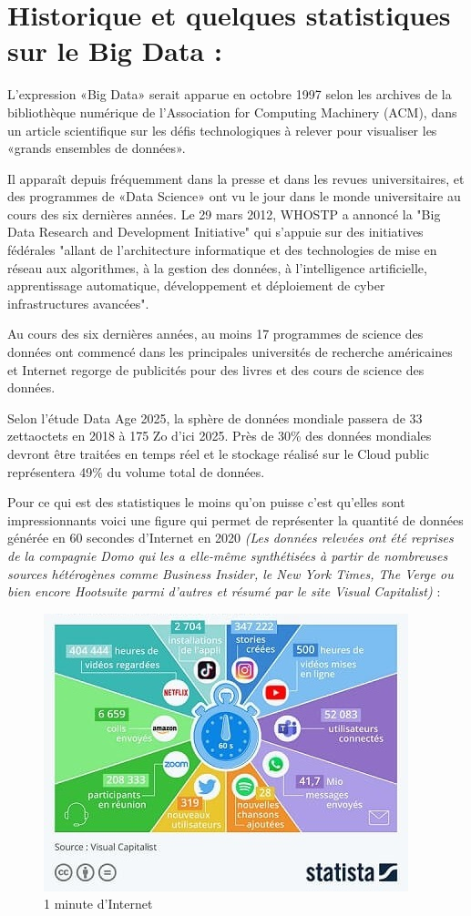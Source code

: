 \section{Historique et quelques statistiques sur le Big Data : }
L'expression «Big Data» serait apparue en octobre 1997 selon les archives de la bibliothèque numérique de l'Association for Computing Machinery (ACM), dans un article scientifique sur les défis technologiques à relever pour visualiser les «grands ensembles de données».

Il apparaît depuis fréquemment dans la presse et dans les revues universitaires, et des programmes de «Data Science» ont vu le jour dans le monde universitaire au cours des six dernières années. Le 29 mars 2012, WHOSTP a annoncé la "Big Data Research and Development Initiative" qui s'appuie sur des initiatives fédérales "allant de l'architecture informatique et des technologies de mise en réseau aux algorithmes, à la gestion des données, à l'intelligence artificielle, apprentissage automatique, développement et déploiement de cyber infrastructures avancées".

Au cours des six dernières années, au moins 17 programmes de science des données ont commencé dans les principales universités de recherche américaines et Internet regorge de publicités pour des livres et des cours de science des données. 

Selon l'étude Data Age 2025, la sphère de données mondiale passera de 33 zettaoctets en 2018 à 175 Zo d'ici 2025. Près de 30\% des données mondiales devront être traitées en temps réel et le stockage réalisé sur le Cloud public représentera 49\% du volume total de données.

Pour ce qui est des statistiques le moins qu'on puisse c'est qu'elles sont impressionnants voici une figure qui permet de représenter la quantité de données générée en 60 secondes d'Internet en 2020 
\textit{(Les données relevées ont été reprises de la compagnie Domo qui les a elle-même synthétisées à partir de nombreuses sources hétérogènes comme Business Insider, le New York Times, The Verge ou bien encore Hootsuite parmi d'autres et résumé par le site Visual Capitalist)} :

\begin{figure}[h]
	\centering
    \includegraphics[scale=0.8]{img/1.1}
    \caption{1 minute d'Internet}
\end{figure}

